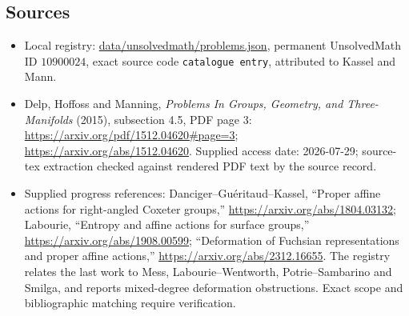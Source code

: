 \documentclass[11pt]{article}
\begin{document}
\subsection{Sources}
\begin{itemize}
\item Local registry: \url{data/unsolvedmath/problems.json}, permanent UnsolvedMath ID $10900024$, exact source code \texttt{catalogue entry}, attributed to Kassel and Mann.
\item Delp, Hoffoss and Manning, \emph{Problems In Groups, Geometry, and Three-Manifolds} (2015), subsection 4.5, PDF page 3: \url{https://arxiv.org/pdf/1512.04620#page=3}; \url{https://arxiv.org/abs/1512.04620}. Supplied access date: 2026-07-29; source-tex extraction checked against rendered PDF text by the source record.
\item Supplied progress references: Danciger--Gu\'eritaud--Kassel, ``Proper affine actions for right-angled Coxeter groups,'' \url{https://arxiv.org/abs/1804.03132}; Labourie, ``Entropy and affine actions for surface groups,'' \url{https://arxiv.org/abs/1908.00599}; ``Deformation of Fuchsian representations and proper affine actions,'' \url{https://arxiv.org/abs/2312.16655}. The registry relates the last work to Mess, Labourie--Wentworth, Potrie--Sambarino and Smilga, and reports mixed-degree deformation obstructions. Exact scope and bibliographic matching require verification.
\end{itemize}
\end{document}
